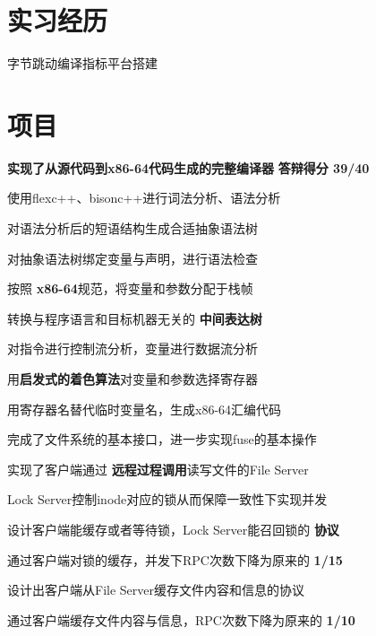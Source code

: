 \documentclass[]{deedy-resume-openfont}
\begin{document}
\begin{minipage}[t]{0.73\textwidth} 

\section{实习经历} 
\vspace{\topsep}
\begin{tightemize}
	\item 字节跳动编译指标平台搭建
\end{tightemize}
\sectionsep

\section{项目} 
\begin{tightemize}
    \item \textbf{实现了从源代码到x86-64代码生成的完整编译器} \textbf{答辩得分 39/40}
    \item 使用flexc++、bisonc++进行词法分析、语法分析
    \item 对语法分析后的短语结构生成合适抽象语法树
    \item 对抽象语法树绑定变量与声明，进行语法检查
    \item 按照 \textbf{x86-64}规范，将变量和参数分配于栈帧
    \item 转换与程序语言和目标机器无关的 \textbf{中间表达树}
    \item 对指令进行控制流分析，变量进行数据流分析
    \item 用\textbf{启发式的着色算法}对变量和参数选择寄存器
    \item 用寄存器名替代临时变量名，生成x86-64汇编代码
\end{tightemize}
\sectionsep
\sectionsep

\begin{tightemize}
\item 完成了文件系统的基本接口，进一步实现fuse的基本操作
\item 实现了客户端通过 \textbf{远程过程调用}读写文件的File Server
\item Lock Server控制inode对应的锁从而保障一致性下实现并发
\item 设计客户端能缓存或者等待锁，Lock Server能召回锁的 \textbf{协议}
\item 通过客户端对锁的缓存，并发下RPC次数下降为原来的 \textbf{1/15}
\item 设计出客户端从File Server缓存文件内容和信息的协议
\item 通过客户端缓存文件内容与信息，RPC次数下降为原来的 \textbf{1/10}
\end{tightemize}
\sectionsep
\sectionsep


\end{minipage}
\end{document}
